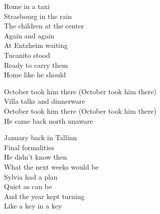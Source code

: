 \begin{lyrics}
Rome in a taxi\\
Strasbourg in the rain\\
The children at the center\\
Again and again\\
At Entzheim waiting\\
Tucanito stood\\
Ready to carry them\\
Home like he should

October took him there (October took him there)\\
Villa talks and dinnerware\\
October took him there (October took him there)\\
He came back north unaware

January back in Tallinn\\
Final formalities\\
He didn't know then\\
What the next weeks would be\\
Sylvia had a plan\\
Quiet as can be\\
And the year kept turning\\
Like a key in a key
\end{lyrics}

